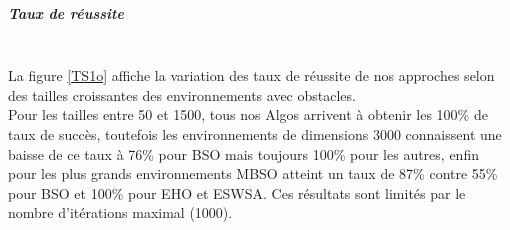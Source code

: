 \noindent
\begin{minipage}[t]{0.55\textwidth}
	\subparagraph{Taux de réussite}
	\textbf{}\\
	
	La figure \ref{TS1o} affiche la variation des taux de réussite de nos approches selon des tailles croissantes des environnements avec obstacles.\\
	
	Pour les tailles entre 50 et 1500, tous nos Algos arrivent à obtenir les 100\% de taux de succès, toutefois les environnements de dimensions 3000  connaissent une baisse de ce taux à 76\% pour BSO mais toujours 100\% pour les autres, enfin pour les plus grands environnements MBSO atteint un taux de 87\% contre 55\% pour BSO et 100\% pour EHO et ESWSA. Ces résultats sont limités par le nombre d'itérations maximal (1000).
	
	
\end{minipage}\hfill
\begin{minipage}[t]{0.55\textwidth}
	\captionsetup{width=0.8\linewidth}
	\centering{}
	\label{TS1o}
\end{minipage}\hfill



\vspace{0.5cm}
 

